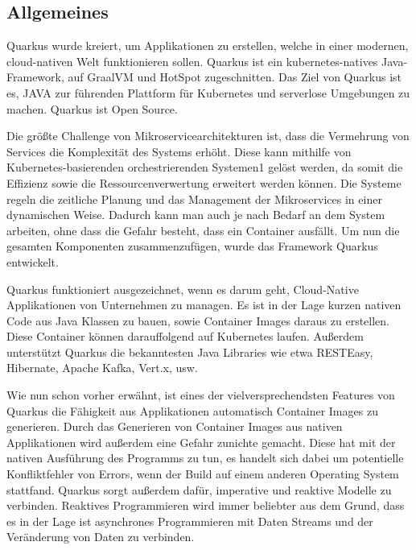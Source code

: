  
\subsection{Allgemeines}
Quarkus wurde kreiert, um Applikationen zu erstellen, welche in einer modernen, cloud-nativen Welt funktionieren sollen. Quarkus ist ein kubernetes-natives Java-Framework, auf GraalVM und HotSpot zugeschnitten. Das Ziel von Quarkus ist es, JAVA zur führenden Plattform für Kubernetes und serverlose Umgebungen zu machen. Quarkus ist Open Source.
 
Die größte Challenge von Mikroservicearchitekturen ist, dass die Vermehrung von Services die Komplexität des Systems erhöht. Diese kann mithilfe von Kubernetes-basierenden orchestrierenden Systemen1 gelöst werden, da somit die Effizienz sowie die Ressourcenverwertung erweitert werden können. Die Systeme regeln die zeitliche Planung und das Management der Mikroservices in einer dynamischen Weise. Dadurch kann man auch je nach Bedarf an dem System arbeiten, ohne dass die Gefahr besteht, dass ein Container ausfällt. Um nun die gesamten Komponenten zusammenzufügen, wurde das Framework Quarkus entwickelt.
 
Quarkus funktioniert ausgezeichnet, wenn es darum geht, Cloud-Native Applikationen von Unternehmen zu managen. Es ist in der Lage kurzen nativen Code aus Java Klassen zu bauen, sowie Container Images daraus zu erstellen. Diese Container können darauffolgend auf Kubernetes laufen. Außerdem unterstützt Quarkus die bekanntesten Java Libraries wie etwa RESTEasy, Hibernate, Apache Kafka, Vert.x, usw.
 
Wie nun schon vorher erwähnt, ist eines der vielversprechendsten Features von Quarkus die Fähigkeit aus Applikationen automatisch Container Images zu generieren. Durch das Generieren von Container Images aus nativen Applikationen wird außerdem eine Gefahr zunichte gemacht. Diese hat mit der nativen Ausführung des Programms zu tun, es handelt sich dabei um potentielle Konfliktfehler von Errors, wenn der Build auf einem anderen Operating System stattfand.
Quarkus sorgt außerdem dafür, imperative und reaktive Modelle zu verbinden. Reaktives Programmieren wird immer beliebter aus dem Grund, dass es in der Lage ist asynchrones Programmieren mit Daten Streams und der Veränderung von Daten zu verbinden.
 

